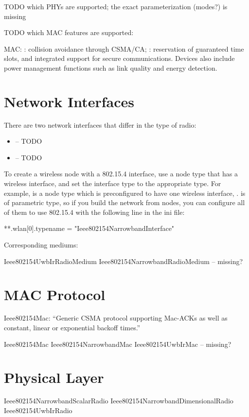 TODO which PHYs are supported; the exact parameterization (modes?) is missing

TODO which MAC features are supported:

MAC: : collision avoidance through CSMA/CA; : reservation
of guaranteed time slots, and integrated support for secure communications.
Devices also include power management functions such as link quality and energy
detection.

\section{Network Interfaces}

There are two network interfaces that differ in the type of radio:

\begin{itemize}
  \item {} -- TODO
  \item {} -- TODO
\end{itemize}


To create a wireless node with a 802.15.4 interface, use a node type 
that has a wireless interface, and set the interface type to the 
appropriate type. For example,  is a node type 
which is preconfigured to have one wireless interface, .
 is of parametric type, so if you build the network from
 nodes, you can configure all of them to use
802.15.4 with the following line in the ini file:

\begin{inifile}
**.wlan[0].typename = "Ieee802154NarrowbandInterface"
\end{inifile}

Corresponding mediums:

Ieee802154UwbIrRadioMedium
Ieee802154NarrowbandRadioMedium -- missing?

\section{MAC Protocol}

Ieee802154Mac: ``Generic CSMA protocol supporting Mac-ACKs as well as
constant, linear or exponential backoff times.''

Ieee802154Mac
Ieee802154NarrowbandMac
Ieee802154UwbIrMac -- missing?

\section{Physical Layer}

Ieee802154NarrowbandScalarRadio
Ieee802154NarrowbandDimensionalRadio
Ieee802154UwbIrRadio

\fi


